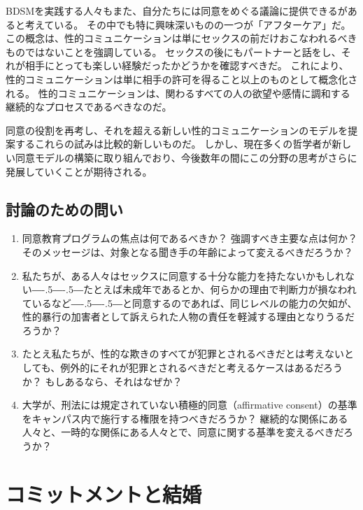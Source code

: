 \documentclass[paper=a4,book,openany]{jlreq}
\def\DDASH{―\kern-.5\zw―\kern-.5\zw―} %
\begin{document}
BDSMを実践する人々もまた、自分たちには同意をめぐる議論に提供できるがあると考えている。
その中でも特に興味深いものの一つが「アフターケア」だ。
この概念は、性的コミュニケーションは単にセックスの前だけおこなわれるべきものではないことを強調している。
セックスの後にもパートナーと話をし、それが相手にとっても楽しい経験だったかどうかを確認すべきだ。
これにより、性的コミュニケーションは単に相手の許可を得ること以上のものとして概念化される。
性的コミュニケーションは、関わるすべての人の欲望や感情に調和する継続的なプロセスであるべきなのだ。

同意の役割を再考し、それを超える新しい性的コミュニケーションのモデルを提案するこれらの試みは比較的新しいものだ。
しかし、現在多くの哲学者が新しい同意モデルの構築に取り組んでおり、今後数年の間にこの分野の思考がさらに発展していくことが期待される。

\section{討論のための問い}

\begin{enumerate}

\item 同意教育プログラムの焦点は何であるべきか？ 強調すべき主要な点は何か？ そのメッセージは、対象となる聞き手の年齢によって変えるべきだろうか？

\item  私たちが、ある人々はセックスに同意する十分な能力を持たないかもしれない{\DDASH}たとえば未成年であるとか、何らかの理由で判断力が損なわれているなど{\DDASH}と同意するのであれば、同じレベルの能力の欠如が、性的暴行の加害者として訴えられた人物の責任を軽減する理由となりうるだろうか？

\item  たとえ私たちが、性的な欺きのすべてが犯罪とされるべきだとは考えないとしても、例外的にそれが犯罪とされるべきだと考えるケースはあるだろうか？ もしあるなら、それはなぜか？

\item  大学が、刑法には規定されていない積極的同意（affirmative consent）の基準をキャンパス内で施行する権限を持つべきだろうか？ 継続的な関係にある人々と、一時的な関係にある人々とで、同意に関する基準を変えるべきだろうか？
\end{enumerate}

\chapter{コミットメントと結婚}
\end{document}
